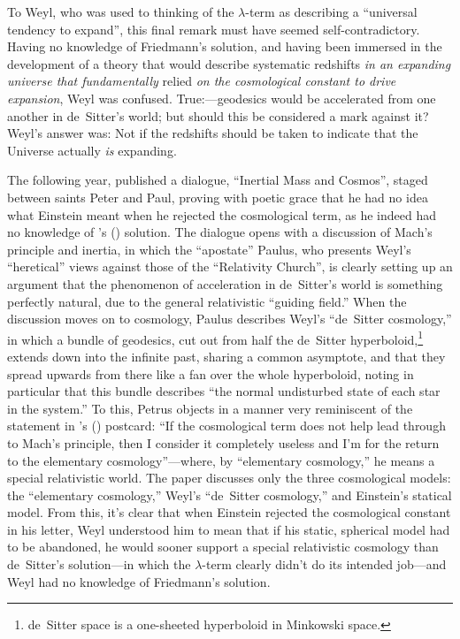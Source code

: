 \documentclass[12 pt]{article}
\def\citeapos#1{\citeauthor{#1}'s (\citeyear{#1})}
\begin{document}
To Weyl, who was used to thinking of the $\lambda$-term as describing a ``universal tendency to expand'', this final remark must have seemed self-contradictory. Having no knowledge of Friedmann's solution, and having been immersed in the development of a theory that would describe systematic redshifts \textit{in an expanding universe that fundamentally} relied \textit{on the cosmological constant to drive expansion}, Weyl was confused. True:---geodesics would be accelerated from one another in de~Sitter's world; but should this be considered a mark against it? Weyl's answer was: Not if the redshifts should be taken to indicate that the Universe actually \textit{is} expanding. 

The following year, \citet{Weyl1924} published a dialogue, ``Inertial Mass and Cosmos'', staged between saints Peter and Paul, proving with poetic grace that he had no idea what Einstein meant when he rejected the cosmological term, as he indeed had no knowledge of \citeapos{Friedmann1922} solution. The dialogue opens with a discussion of Mach's principle and inertia, in which the ``apostate'' Paulus, who presents Weyl's ``heretical'' views against those of the ``Relativity Church'', is clearly setting up an argument that the phenomenon of acceleration in de~Sitter's world is something perfectly natural, due to the general relativistic ``guiding field.'' When the discussion moves on to cosmology, Paulus describes Weyl's ``de~Sitter cosmology,'' in which a bundle of geodesics, cut out from half the de~Sitter hyperboloid,\footnote{de~Sitter space is a one-sheeted hyperboloid in Minkowski space.}  extends down into the infinite past, sharing a common asymptote, and that they spread upwards from there like a fan over the whole hyperboloid, noting in particular that this bundle describes ``the normal undisturbed state of each star in the system.''
To this, Petrus objects in a manner very reminiscent of the statement in \citeapos{Einstein1923a} postcard: ``If the cosmological term does not help lead through to Mach's principle, then I consider it completely useless and I'm for the return to the elementary cosmology''---where, by ``elementary cosmology,'' he means a special relativistic world. The paper discusses only the three cosmological models: the ``elementary cosmology,'' Weyl's ``de~Sitter cosmology,'' and Einstein's statical model. From this, it's clear that when Einstein rejected the cosmological constant in his letter, Weyl understood him to mean that if his static, spherical model had to be abandoned, he would sooner support a special relativistic cosmology than de~Sitter's solution---in which the $\lambda$-term clearly didn't do its intended job---and Weyl had no knowledge of Friedmann's solution.
\end{document}
